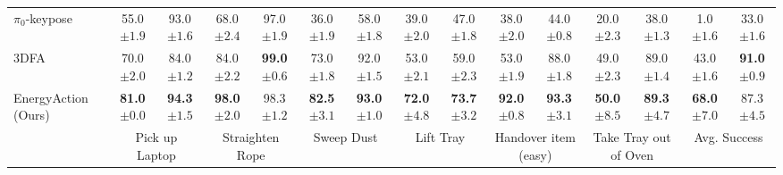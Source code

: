 \begin{table}[ht]
{\begin{tabular}{l|cc|cc|cc|cc|cc|cc|cc}
    $\pi_0$-keypose~\cite{black2410pi0} & 55.0\textcolor[gray]{0.5}{\small{$\pm1.9$}} & 93.0\textcolor[gray]{0.5}{\small{$\pm1.6$}} & 68.0\textcolor[gray]{0.5}{\small{$\pm2.4$}} & 97.0\textcolor[gray]{0.5}{\small{$\pm1.9$}} & 36.0\textcolor[gray]{0.5}{\small{$\pm1.9$}} & 58.0\textcolor[gray]{0.5}{\small{$\pm1.8$}} & 39.0\textcolor[gray]{0.5}{\small{$\pm2.0$}} & 47.0\textcolor[gray]{0.5}{\small{$\pm1.8$}} & 38.0\textcolor[gray]{0.5}{\small{$\pm2.0$}} & 44.0\textcolor[gray]{0.5}{\small{$\pm0.8$}} & 20.0\textcolor[gray]{0.5}{\small{$\pm2.3$}} & 38.0\textcolor[gray]{0.5}{\small{$\pm1.3$}} & 1.0\textcolor[gray]{0.5}{\small{$\pm1.6$}} & 33.0\textcolor[gray]{0.5}{\small{$\pm1.6$}} \\
    3DFA~\cite{gkanatsios20253d} & 70.0\textcolor[gray]{0.5}{\small{$\pm2.0$}} & 84.0\textcolor[gray]{0.5}{\small{$\pm1.2$}} & 84.0\textcolor[gray]{0.5}{\small{$\pm2.2$}} & \textbf{99.0}\textcolor[gray]{0.5}{\small{$\pm0.6$}} & 73.0\textcolor[gray]{0.5}{\small{$\pm1.8$}} & 92.0\textcolor[gray]{0.5}{\small{$\pm1.5$}} & 53.0\textcolor[gray]{0.5}{\small{$\pm2.1$}} & 59.0\textcolor[gray]{0.5}{\small{$\pm2.3$}} & 53.0\textcolor[gray]{0.5}{\small{$\pm1.9$}} & 88.0\textcolor[gray]{0.5}{\small{$\pm1.8$}} & 49.0\textcolor[gray]{0.5}{\small{$\pm2.3$}} & 89.0\textcolor[gray]{0.5}{\small{$\pm1.4$}} & 43.0\textcolor[gray]{0.5}{\small{$\pm1.6$}} & \textbf{91.0}\textcolor[gray]{0.5}{\small{$\pm0.9$}} \\
    \rowcolor{blue!5!cyan!10}EnergyAction (Ours) & \textbf{81.0}\textcolor[gray]{0.5}{\small{$\pm0.0$}} & \textbf{94.3}\textcolor[gray]{0.5}{\small{$\pm1.5$}} & \textbf{98.0}\textcolor[gray]{0.5}{\small{$\pm2.0$}} & 98.3\textcolor[gray]{0.5}{\small{$\pm1.2$}} & \textbf{82.5}\textcolor[gray]{0.5}{\small{$\pm3.1$}} & \textbf{93.0}\textcolor[gray]{0.5}{\small{$\pm1.0$}} & \textbf{72.0}\textcolor[gray]{0.5}{\small{$\pm4.8$}} & \textbf{73.7}\textcolor[gray]{0.5}{\small{$\pm3.2$}} & \textbf{92.0}\textcolor[gray]{0.5}{\small{$\pm0.8$}} & \textbf{93.3}\textcolor[gray]{0.5}{\small{$\pm3.1$}} & \textbf{50.0}\textcolor[gray]{0.5}{\small{$\pm8.5$}} & \textbf{89.3}\textcolor[gray]{0.5}{\small{$\pm4.7$}} & \textbf{68.0}\textcolor[gray]{0.5}{\small{$\pm7.0$}} & 87.3\textcolor[gray]{0.5}{\small{$\pm4.5$}} \\
    \midrule[0.75pt]
    & \multicolumn{2}{c|}{Pick up Laptop} & \multicolumn{2}{c|}{Straighten Rope} & \multicolumn{2}{c|}{Sweep Dust} & \multicolumn{2}{c|}{Lift Tray} & \multicolumn{2}{c|}{Handover item (easy)} & \multicolumn{2}{c|}{Take Tray out of Oven} & \multicolumn{2}{c}{\cellcolor[rgb]{.902,.996,1.0}Avg. Success}\\

\end{tabular}}
\end{table}
